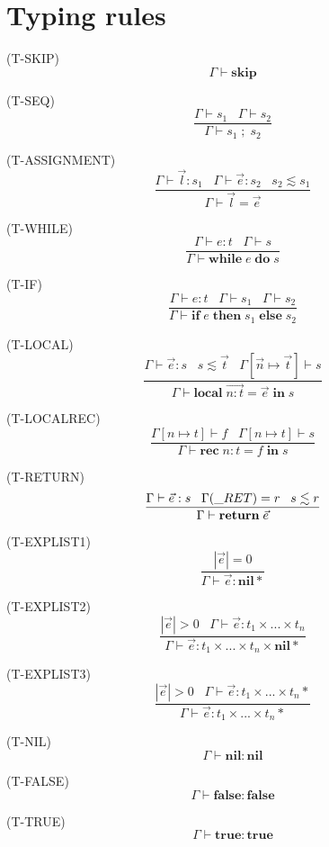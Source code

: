 \documentclass{paper}
\newcommand{\Nil}{\mathbf{nil}}
\newcommand{\False}{\mathbf{false}}
\newcommand{\True}{\mathbf{true}}
\newcommand{\mylabel}[1]{\; (\textsc{#1})}
\newcommand{\env}{\Gamma}
\newcommand{\ret}{\string_RET}
\begin{document}
\section{Typing rules}

\noindent

\mylabel{T-SKIP}
\[
\env \vdash \mathbf{skip}
\]

\mylabel{T-SEQ}
\[
\dfrac{\env \vdash s_{1} \;\;\;
       \env \vdash s_{2}}
      {\env \vdash s_{1} \; ; \; s_{2}}
\]

\mylabel{T-ASSIGNMENT}
\[
\dfrac{\env \vdash \vec{l}:s_{1} \;\;\;
       \env \vdash \vec{e}:s_{2} \;\;\;
       s_{2} \lesssim s_{1}}
      {\env \vdash \vec{l} = \vec{e}}
\]

\mylabel{T-WHILE}
\[
\dfrac{\env \vdash e:t \;\;\;
       \env \vdash s}
      {\env \vdash \mathbf{while} \; e \; \mathbf{do} \; s}
\]

\mylabel{T-IF}
\[
\dfrac{\env \vdash e:t \;\;\;
       \env \vdash s_{1} \;\;\;
       \env \vdash s_{2}}
      {\env \vdash \mathbf{if} \; e \; \mathbf{then} \; s_{1} \; \mathbf{else} \; s_{2}}
\]

\mylabel{T-LOCAL}
\[
\dfrac{\env \vdash \vec{e}:s \;\;\;
       s \lesssim \vec{t} \;\;\;
       \env[\vec{n} \mapsto \vec{t}] \vdash s}
      {\env \vdash \mathbf{local} \; \vec{n{:}t} = \vec{e} \; \mathbf{in} \; s}
\]

\mylabel{T-LOCALREC}
\[
\dfrac{\env[n \mapsto t] \vdash f \;\;\;
       \env[n \mapsto t] \vdash s}
      {\env \vdash \mathbf{rec} \; n{:}t = f \; \mathbf{in} \; s}
\]

\mylabel{T-RETURN}
\[
\dfrac{\env \vdash \vec{e}:s \;\;\;
       \env(\ret) = r \;\;\;
       s \lesssim r}
      {\env \vdash \mathbf{return} \; \vec{e}}
\]

\mylabel{T-EXPLIST1}
\[
\dfrac{|\vec{e}| = 0}
      {\env \vdash \vec{e}:\Nil{*}}
\]

\mylabel{T-EXPLIST2}
\[
\dfrac{|\vec{e}| > 0 \;\;\;
       \env \vdash \vec{e}:t_{1} \times ... \times t_{n}}
      {\env \vdash \vec{e}:t_{1} \times ... \times t_{n} \times \Nil{*}}
\]

\mylabel{T-EXPLIST3}
\[
\dfrac{|\vec{e}| > 0 \;\;\;
       \env \vdash \vec{e}:t_{1} \times ... \times t_{n}{*}}
      {\env \vdash \vec{e}:t_{1} \times ... \times t_{n}{*}}
\]

\mylabel{T-NIL}
\[
\env \vdash \mathbf{nil}:\Nil
\]

\mylabel{T-FALSE}
\[
\env \vdash \mathbf{false}:\False
\]

\mylabel{T-TRUE}
\[
\env \vdash \mathbf{true}:\True
\]
\end{document}
